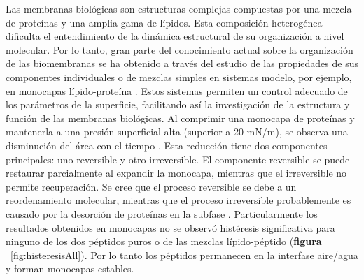 Las membranas biológicas son estructuras complejas compuestas por una mezcla de proteínas y una amplia gama de lípidos. Esta composición heterogénea dificulta el entendimiento de la dinámica estructural de su organización a nivel molecular. Por lo tanto, gran parte del conocimiento actual sobre la organización de las biomembranas se ha obtenido a través del estudio de las propiedades de sus componentes individuales o de mezclas simples en sistemas modelo, por ejemplo,  en monocapas lípido-proteína \citep{Mitropoulos2014}. Estos sistemas permiten un control adecuado de los parámetros de la superficie, facilitando así la investigación de la estructura y función de las membranas biológicas. Al comprimir una monocapa de proteínas y mantenerla a una presión superficial alta (superior a 20 mN/m), se observa una disminución del área con el tiempo \citep{macritchie1991}. Esta reducción tiene dos componentes principales: uno reversible y otro irreversible. El componente reversible se puede restaurar parcialmente al expandir la monocapa, mientras que el irreversible no permite recuperación. Se cree que el proceso reversible se debe a un reordenamiento molecular, mientras que el proceso irreversible probablemente es causado por la desorción de proteínas en la subfase \citep{Macritchie1981}. Particularmente los resultados obtenidos en monocapas no se observó histéresis significativa para ninguno de los dos péptidos puros o de las mezclas lípido-péptido (\textbf{figura} ~\ref{fig:histeresisAll}). Por lo tanto los péptidos permanecen en la interfase aire/agua y forman monocapas estables. 
 
